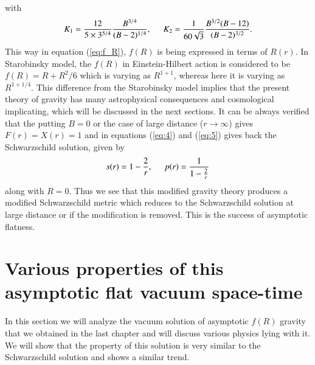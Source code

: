 \documentclass[12pt,a4paper,oneside]{book}
\newcommand{\eq}[2]{\begin{equation} \label{eq:#1} #2 \end{equation}}
\newcommand{\Eref}[1]{(\ref{eq:#1})}
\begin{document}
with $$K_1 = \frac{12}{5\times3^{5/4}}\frac{B^{3/4}}{(B-2)^{1/4}},\hspace{0.5cm} K_2=\frac{1}{60\sqrt{3}}\frac{B^{3/2}(B-12)}{(B-2)^{3/2}}.$$
This way in equation \Eref{f_R}, $f(R)$ is being expressed in terms of $R(r)$. In Starobinsky model, the $f(R)$ in Einstein-Hilbert action is considered to be $f(R) = R+R^2/6$ which is varying as $R^{1+1}$, whereas here it is varying as $R^{1+1/4}$. This difference from the Starobinsky model implies that the present theory of gravity has many astrophysical consequences and cosmological implicating, which will be discussed in the next sections.
It can be always verified that the putting $B=0$ or the case of large distance ($r\to\infty$) gives $F(r) = X(r) =1$ and in equations \Eref{4} and \Eref{5} gives back the Schwarzschild solution, given by
\eq{Sch_sol}{s(r) = 1-\frac{2}{r}, \hspace{0.5cm} p(r) = \frac{1}{1-\frac{2}{r}}}
along with $R=0$. Thus we see that this modified gravity theory produces a modified Schwarzschild metric which reduces to the Schwarzschild solution at large distance or if the modification is removed. This is the success of asymptotic flatness.

\section{Various properties of this asymptotic flat vacuum space-time}\label{Sec_Var_prop_non_rot}
In this section we will analyze the vacuum solution of asymptotic $f(R)$ gravity that we obtained in the last chapter and will discuss various physics lying with it. We will show that the property of this solution is very similar to the Schwarzschild solution and shows a similar trend.
\end{document}
